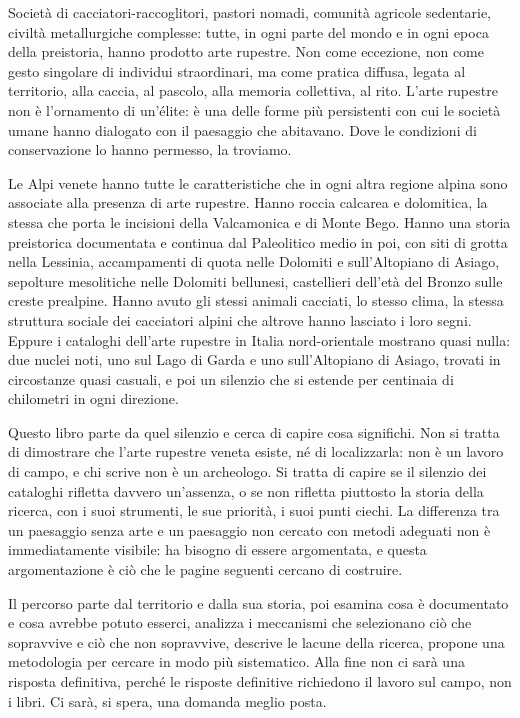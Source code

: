 Società di cacciatori-raccoglitori, pastori nomadi, comunità agricole sedentarie, civiltà metallurgiche complesse: tutte, in ogni parte del mondo e in ogni epoca della preistoria, hanno prodotto arte rupestre. Non come eccezione, non come gesto singolare di individui straordinari, ma come pratica diffusa, legata al territorio, alla caccia, al pascolo, alla memoria collettiva, al rito. L'arte rupestre non è l'ornamento di un'élite: è una delle forme più persistenti con cui le società umane hanno dialogato con il paesaggio che abitavano. Dove le condizioni di conservazione lo hanno permesso, la troviamo.

Le Alpi venete hanno tutte le caratteristiche che in ogni altra regione alpina sono associate alla presenza di arte rupestre. Hanno roccia calcarea e dolomitica, la stessa che porta le incisioni della Valcamonica e di Monte Bego. Hanno una storia preistorica documentata e continua dal Paleolitico medio in poi, con siti di grotta nella Lessinia, accampamenti di quota nelle Dolomiti e sull'Altopiano di Asiago, sepolture mesolitiche nelle Dolomiti bellunesi, castellieri dell'età del Bronzo sulle creste prealpine. Hanno avuto gli stessi animali cacciati, lo stesso clima, la stessa struttura sociale dei cacciatori alpini che altrove hanno lasciato i loro segni. Eppure i cataloghi dell'arte rupestre in Italia nord-orientale mostrano quasi nulla: due nuclei noti, uno sul Lago di Garda e uno sull'Altopiano di Asiago, trovati in circostanze quasi casuali, e poi un silenzio che si estende per centinaia di chilometri in ogni direzione.

Questo libro parte da quel silenzio e cerca di capire cosa significhi. Non si tratta di dimostrare che l'arte rupestre veneta esiste, né di localizzarla: non è un lavoro di campo, e chi scrive non è un archeologo. Si tratta di capire se il silenzio dei cataloghi rifletta davvero un'assenza, o se non rifletta piuttosto la storia della ricerca, con i suoi strumenti, le sue priorità, i suoi punti ciechi. La differenza tra un paesaggio senza arte e un paesaggio non cercato con metodi adeguati non è immediatamente visibile: ha bisogno di essere argomentata, e questa argomentazione è ciò che le pagine seguenti cercano di costruire.

Il percorso parte dal territorio e dalla sua storia, poi esamina cosa è documentato e cosa avrebbe potuto esserci, analizza i meccanismi che selezionano ciò che sopravvive e ciò che non sopravvive, descrive le lacune della ricerca, propone una metodologia per cercare in modo più sistematico. Alla fine non ci sarà una risposta definitiva, perché le risposte definitive richiedono il lavoro sul campo, non i libri. Ci sarà, si spera, una domanda meglio posta.
